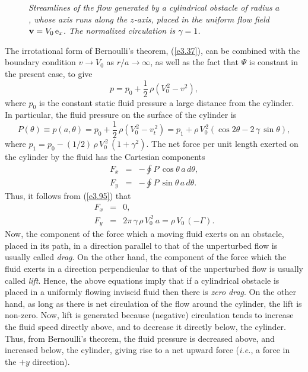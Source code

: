 \begin{figure}
\epsfysize=3in
\centerline{}
\caption{\em Streamlines of the flow generated by a cylindrical obstacle of radius $a$, whose axis runs  along the $z$-axis,
placed in the uniform flow field ${\bf v}= V_0\,{\rm e}_x$. The normalized circulation is $\gamma=1$. }\label{fxcyl1}
\end{figure}

The irrotational form of Bernoulli's theorem, (\ref{e3.37}), can be combined with the boundary condition $v\rightarrow V_0$
as $r/a\rightarrow \infty$, as well as the fact that $\Psi$ is constant in the present case,  to give
\begin{equation}
p = p_0 + \frac{1}{2}\,\rho\left(V_0^{\,2}-v^2\right),
\end{equation}
where $p_0$ is the constant static fluid pressure a large distance from the cylinder. In particular, the fluid
pressure on the surface of the cylinder is
\begin{equation}\label{e3.95}
P(\theta)\equiv p(a,\theta) = p_0 + \frac{1}{2}\,\rho\left(V_0^{\,2}-v_t^{\,2}\right)= p_1 + \rho\,V_0^{\,2}\left(\cos 2\theta-2\,\gamma\,\sin\theta\right),
\end{equation}
where $p_1=p_0-(1/2)\,\rho\,V_0^{\,2}\,(1+\gamma^2)$. 
The net force per unit length exerted on the cylinder by the fluid has the Cartesian components
\begin{eqnarray}
F_x &=& -\oint P\,\cos\theta\,a\,d\theta,\\[0.5ex]
F_y&=& -\oint P\,\sin\theta\,a\,d\theta.
\end{eqnarray}
Thus, it follows from (\ref{e3.95}) that
\begin{eqnarray}
F_x &=& 0,\\[0.5ex]
F_y&=&  2\pi\,\gamma\,\rho\,V_0^{\,2}\,a= \rho\,V_0\,(-\Gamma).
\end{eqnarray}
Now, the component of the force which a moving fluid exerts on an obstacle, placed in its path, in a direction parallel to that of  the unperturbed  flow is usually called {\em drag}. On the other hand,  the component of the force which
the fluid exerts in a direction perpendicular to that of  the unperturbed flow is usually called {\em lift}. Hence, the above equations imply
that if a cylindrical obstacle is placed in a uniformly flowing inviscid fluid then there is {\em zero drag}. On the other
hand, as long as there is net circulation of the flow around the cylinder, the lift is non-zero. Now, lift is generated because (negative) 
circulation tends to increase the fluid speed directly above, and to decrease it directly below, the cylinder. 
Thus, from Bernoulli's theorem, the fluid pressure is decreased above, and increased below,
the cylinder, giving rise to a net upward force ({\em i.e.}, a force in the $+y$ direction). 

